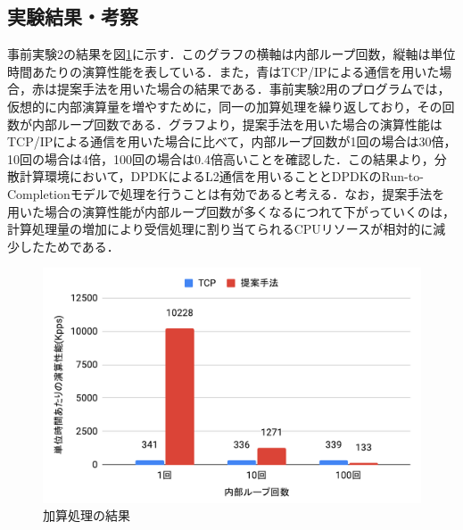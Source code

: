 \subsection{実験結果・考察}
事前実験2の結果を図\ref{fig:PreEvaluationTwoResult}に示す．このグラフの横軸は内部ループ回数，縦軸は単位時間あたりの演算性能を表している．また，青はTCP/IPによる通信を用いた場合，赤は提案手法を用いた場合の結果である．事前実験2用のプログラムでは，仮想的に内部演算量を増やすために，同一の加算処理を繰り返しており，その回数が内部ループ回数である．グラフより，提案手法を用いた場合の演算性能はTCP/IPによる通信を用いた場合に比べて，内部ループ回数が1回の場合は30倍，10回の場合は4倍，100回の場合は0.4倍高いことを確認した．この結果より，分散計算環境において，DPDKによるL2通信を用いることとDPDKのRun-to-Completionモデルで処理を行うことは有効であると考える．なお，提案手法を用いた場合の演算性能が内部ループ回数が多くなるにつれて下がっていくのは，計算処理量の増加により受信処理に割り当てられるCPUリソースが相対的に減少したためである．

\begin{figure}[htb]
  \centering
  \includegraphics[width=\columnwidth]{pictures/PreExperimentTwoResult.pdf}
  \caption{加算処理の結果}
  \label{fig:PreEvaluationTwoResult}
\end{figure}
